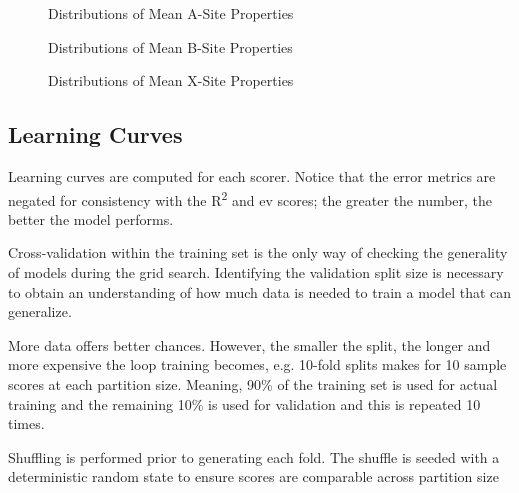 \documentclass[aip, jmp, amsmath, amssymb]{revtex4-2}
\begin{document}
 
\begin{figure}[htbp]
\centering

\caption{Distributions of Mean A-Site Properties}
\end{figure}

 
\begin{figure}[htbp]
\centering

\caption{Distributions of Mean B-Site Properties}
\end{figure}

 
\begin{figure}[htbp]
\centering

\caption{Distributions of Mean X-Site Properties}
\end{figure}

\subsection*{Learning Curves}
\label{sec:org574f136}
Learning curves are computed for each scorer. Notice that the error
metrics are negated for consistency with the R\textsuperscript{2} and ev scores; the
greater the number, the better the model performs.

Cross-validation within the training set is the only way of checking
the generality of models during the grid search. Identifying the
validation split size is necessary to obtain an understanding of how
much data is needed to train a model that can generalize.

More data offers better chances. However, the smaller the split, the
longer and more expensive the loop training becomes, e.g. 10-fold
splits makes for 10 sample scores at each partition size. Meaning, 90\%
of the training set is used for actual training and the remaining 10\%
is used for validation and this is repeated 10 times.

Shuffling is performed prior to generating each fold. The shuffle is
seeded with a deterministic random state to ensure scores are
comparable across partition size
\end{document}
